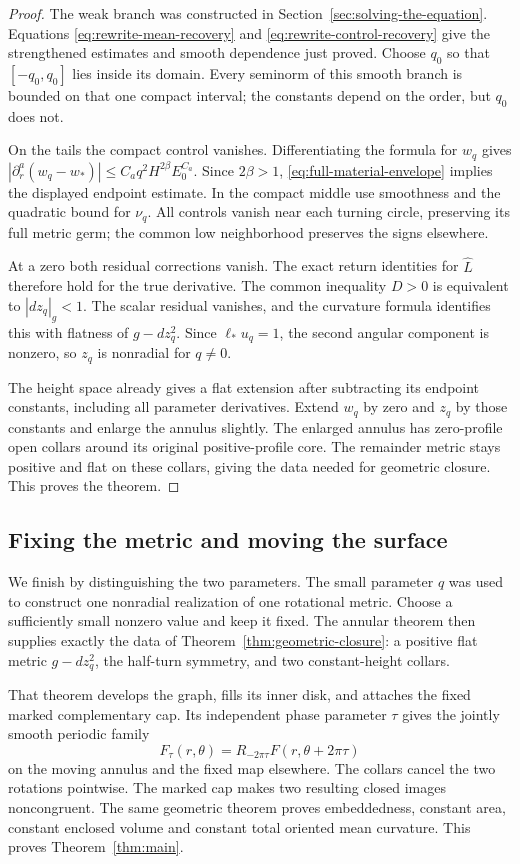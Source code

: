 \begin{proof}
The weak branch was constructed in Section~\ref{sec:solving-the-equation}.
Equations \eqref{eq:rewrite-mean-recovery} and
\eqref{eq:rewrite-control-recovery} give the strengthened estimates
and smooth dependence just proved. Choose $q_0$ so that
$[-q_0,q_0]$ lies inside its domain. Every seminorm of this smooth
branch is bounded on that one compact interval; the constants depend
on the order, but $q_0$ does not.

On the tails the compact control vanishes. Differentiating the
formula for $w_q$ gives
$|\partial_r^a(w_q-w_*)|\le C_aq^2H^{2\beta}E_0^{C_a}$.
Since $2\beta>1$, \eqref{eq:full-material-envelope} implies the
displayed endpoint estimate. In the compact middle use smoothness
and the quadratic bound for $\nu_q$. All controls vanish near each
turning circle, preserving its full metric germ; the common low
neighborhood preserves the signs elsewhere.

At a zero both residual corrections vanish. The exact return
identities for $\widehat L$ therefore hold for the true derivative.
The common inequality $D>0$ is equivalent to $|dz_q|_g<1$.
The scalar residual vanishes, and the curvature formula identifies
this with flatness of $g-dz_q^2$. Since $\ell_*u_q=1$, the second
angular component is nonzero, so $z_q$ is nonradial for $q\ne0$.

The height space already gives a flat extension after subtracting
its endpoint constants, including all parameter derivatives.
Extend $w_q$ by zero and $z_q$ by those constants and enlarge the
annulus slightly. The enlarged annulus has zero-profile open collars around its
original positive-profile core. The remainder metric stays positive
and flat on these collars, giving the data needed for geometric
closure. This proves the theorem.
\end{proof}

\subsection{Fixing the metric and moving the surface}

We finish by distinguishing the two parameters. The small parameter
$q$ was used to construct one nonradial realization of one rotational
metric. Choose a sufficiently small nonzero value and keep it fixed.
The annular theorem then supplies exactly the data of
Theorem~\ref{thm:geometric-closure}: a positive flat metric
$g-dz_q^2$, the half-turn symmetry, and two constant-height collars.

That theorem develops the graph, fills its inner disk, and attaches
the fixed marked complementary cap. Its independent phase parameter
$\tau$ gives the jointly smooth periodic family
\[
 F_\tau(r,\theta)=R_{-2\pi\tau}F(r,\theta+2\pi\tau)
\]
on the moving annulus and the fixed map elsewhere. The collars cancel
the two rotations pointwise. The marked cap makes two resulting
closed images noncongruent. The same geometric theorem proves
embeddedness, constant area, constant enclosed volume and constant
total oriented mean curvature. This proves Theorem~\ref{thm:main}.
